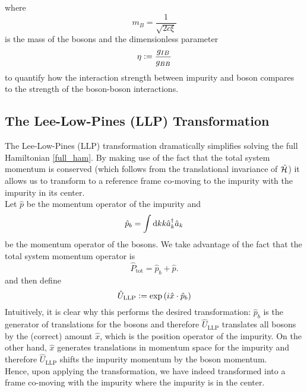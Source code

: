 where \begin{equation}m_B = \frac{1}{\sqrt{2c\xi}}\end{equation} is the mass of the bosons
and the dimensionless parameter 
\begin{equation}
\eta\vcentcolon= \frac{g_{IB}}{g_{BB}}
\end{equation}
to quantify how the interaction strength between impurity and boson compares to the strength of the boson-boson interactions.

\subsection{The Lee-Low-Pines (LLP) Transformation}
The Lee-Low-Pines (LLP) transformation \cite{LLP} dramatically simplifies solving the full Hamiltonian \ref{full_ham}. By making use of the fact that the total system momentum is conserved (which follows from the translational invariance of $\hat{\mathcal{H}}$) it allows us to transform to a reference frame co-moving to the impurity with the impurity in its center. \\
Let $\hat p$ be the momentum operator of the impurity and \begin{equation}\hat p_b= \int\mathrm d k k \hat a^\dagger_k\hat a_k\end{equation} be the momentum operator of the bosons. 
We take advantage of the fact that the total system momentum operator is
\begin{equation}
\hat P_{\mathrm{tot}} = \hat p_b + \hat p.
\end{equation}
and then define
\begin{equation}
\hat U_{\mathrm{LLP}}\vcentcolon= \exp\left(i\hat x\cdot \hat p_b\right)
\end{equation}
Intuitively, it is clear why this performs the desired transformation: $\hat p_b$ is the generator of translations for the bosons and therefore $\hat U_{\mathrm{LLP}}$ translates all bosons by the (correct) amount $\hat x$, which is the position operator of the impurity. On the other hand, $\hat x$ generates translations in momentum space for the impurity and therefore $\hat U_{\mathrm{LLP}}$ shifts the impurity momentum by the boson momentum. \\
Hence, upon applying the transformation, we have indeed transformed into a frame co-moving with the impurity where the impurity is in the center.\\
